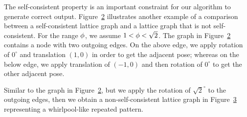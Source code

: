 \begin{figure}
    \centering
    
    \label{fig:self-consistent-graph}
\end{figure}

\begin{figure}
    \centering
    
    \label{fig:lg1}
\end{figure}
\begin{figure}
    \centering
    
    \label{fig:lg2}
\end{figure}

The self-consistent property is an important constraint for our algorithm to generate correct output. Figure~\ref{fig:lg1} illustrates another example of a comparison between a self-consistent lattice graph and a lattice graph that is not self-consistent. 
%
For the range $\phi$, we assume $1 < \phi < \sqrt{2}$.
The graph in Figure~\ref{fig:lg1} contains a node with two outgoing edges. 
On the above edge, we apply rotation of $0^{\circ}$ and translation $(1,0)$ in order to get the adjacent pose; whereas on the below edge, we apply translation of $(-1,0)$ and then rotation of $0^{\circ}$ to get the other adjacent pose. 
%

Similar to the graph in Figure~\ref{fig:lg1}, but we apply the rotation of $\sqrt{2}^{\circ}$ to the outgoing edges, 
then we obtain a non-self-consistent lattice graph in Figure~\ref{fig:lg2} representing a whirlpool-like repeated pattern.


